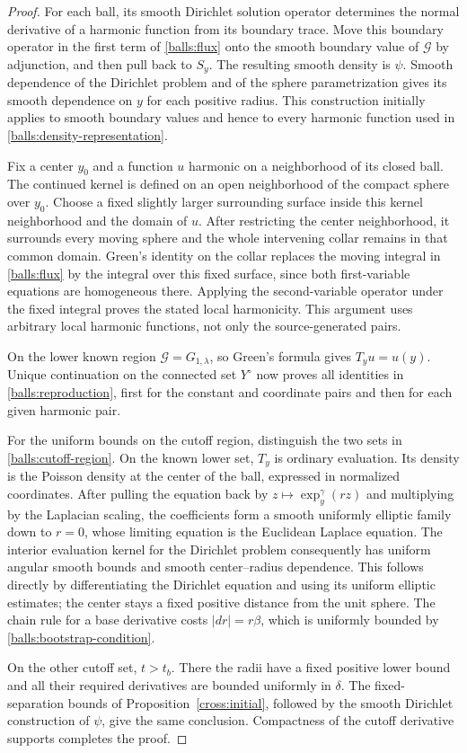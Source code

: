 \begin{proof}
For each ball, its smooth Dirichlet solution operator determines the
normal derivative of a harmonic function from its boundary trace.
Move this boundary operator in the first term of \eqref{balls:flux}
onto the smooth boundary value of $\mathcal G$ by adjunction, and then
pull back to $S_y$.  The resulting smooth density is $\psi$.
Smooth dependence of the Dirichlet problem and of the sphere
parametrization gives its smooth dependence on $y$ for each positive
radius.  This construction initially applies to smooth boundary
values and hence to every harmonic function used in
\eqref{balls:density-representation}.

Fix a center $y_0$ and a function $u$ harmonic on a neighborhood of its
closed ball.  The continued kernel is defined on an open neighborhood
of the compact sphere over $y_0$.  Choose a fixed slightly larger
surrounding surface inside this kernel neighborhood and the domain
of $u$.  After restricting the center neighborhood, it surrounds every
moving sphere and the whole intervening collar remains in that common
domain.  Green's identity on the collar replaces the moving integral
in \eqref{balls:flux} by the integral over this fixed surface, since
both first-variable equations are homogeneous there.  Applying the
second-variable operator under the fixed integral proves the stated
local harmonicity.  This argument uses arbitrary local harmonic
functions, not only the source-generated pairs.

On the lower known region $\mathcal G=G_{1,\lambda}$, so Green's formula
gives $T_yu=u(y)$.  Unique continuation on the connected set $Y^\circ$
now proves all identities in \eqref{balls:reproduction}, first for the
constant and coordinate pairs and then for each given harmonic pair.

For the uniform bounds on the cutoff region, distinguish the two sets
in \eqref{balls:cutoff-region}.  On the known lower set, $T_y$ is ordinary
evaluation.  Its density is the Poisson density at the center of the
ball, expressed in normalized coordinates.  After pulling the equation
back by $z\mapsto\exp_y^\gamma(rz)$ and multiplying by the Laplacian
scaling, the coefficients form a smooth uniformly elliptic family down
to $r=0$, whose limiting equation is the Euclidean Laplace equation.
The interior evaluation kernel for the Dirichlet problem consequently
has uniform angular smooth bounds and smooth center--radius dependence.
This follows directly by differentiating the Dirichlet equation and
using its uniform elliptic estimates; the center stays a fixed positive
distance from the unit sphere.  The chain rule for a base derivative
costs $|dr|=r\beta$, which is uniformly bounded by
\eqref{balls:bootstrap-condition}.

On the other cutoff set, $t>t_b$.  There the radii have a fixed positive
lower bound and all their required derivatives are bounded uniformly in
$\delta$.  The fixed-separation bounds of
Proposition~\ref{cross:initial}, followed by the smooth Dirichlet
construction of $\psi$, give the same conclusion.  Compactness of the
cutoff derivative supports completes the proof.
\end{proof}

